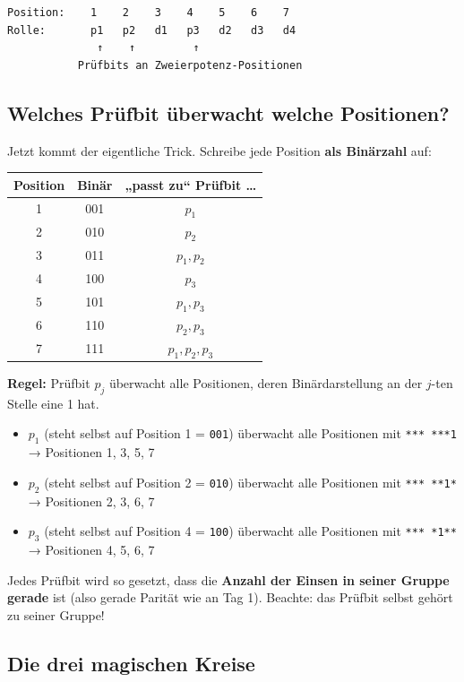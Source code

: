 \begin{verbatim}
Position:    1    2    3    4    5    6    7
Rolle:       p1   p2   d1   p3   d2   d3   d4
              ↑    ↑         ↑
           Prüfbits an Zweierpotenz-Positionen
\end{verbatim}

\subsection*{Welches Prüfbit überwacht welche Positionen?}

Jetzt kommt der eigentliche Trick. Schreibe jede Position \textbf{als
Binärzahl} auf:

\begin{center}
\begin{tabular}{ccc}
  \toprule
  Position & Binär & „passt zu“ Prüfbit \dots \\
  \midrule
  1 & 001 & $p_1$ \\
  2 & 010 & $p_2$ \\
  3 & 011 & $p_1, p_2$ \\
  4 & 100 & $p_3$ \\
  5 & 101 & $p_1, p_3$ \\
  6 & 110 & $p_2, p_3$ \\
  7 & 111 & $p_1, p_2, p_3$ \\
  \bottomrule
\end{tabular}
\end{center}

\textbf{Regel:} Prüfbit $p_j$ überwacht alle Positionen, deren
Binärdarstellung an der $j$-ten Stelle eine 1 hat.

\begin{itemize}
\item $p_1$ (steht selbst auf Position 1 = \texttt{001}) überwacht alle
  Positionen mit \texttt{*** ***1} → Positionen 1, 3, 5, 7
\item $p_2$ (steht selbst auf Position 2 = \texttt{010}) überwacht alle
  Positionen mit \texttt{*** **1*} → Positionen 2, 3, 6, 7
\item $p_3$ (steht selbst auf Position 4 = \texttt{100}) überwacht alle
  Positionen mit \texttt{*** *1**} → Positionen 4, 5, 6, 7
\end{itemize}

Jedes Prüfbit wird so gesetzt, dass die \textbf{Anzahl der Einsen in
seiner Gruppe gerade} ist (also gerade Parität wie an Tag 1). Beachte:
das Prüfbit selbst gehört zu seiner Gruppe!

\subsection*{Die drei magischen Kreise}

